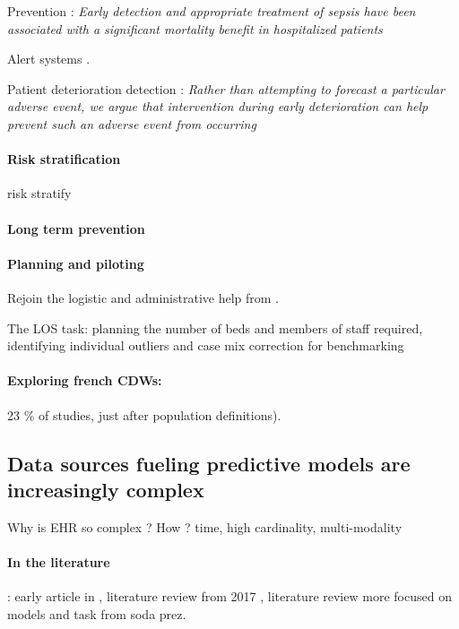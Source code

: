 \documentclass[french,12pt,twoside,a4paper]{book}
\begin{document}
Prevention : \textit{Early detection and appropriate treatment of sepsis have
  been associated with a significant mortality benefit in hospitalized patients}
\citep{wong2021external}

Alert systems \citep{yu2018artificial}.

Patient deterioration detection \citep{rothman2013development}: \textit{Rather than attempting to forecast a particular
  adverse event, we argue that intervention during early deterioration can help prevent such an adverse event from
  occurring}

\paragraph{Risk stratification}

risk stratify \citep{tang2007global}

\paragraph{Long term prevention}


\paragraph{Planning and piloting}

Rejoin the logistic and administrative help from \cite{topol2019high}.

The LOS task: planning the number of beds and members of staff required,
identifying individual outliers and case mix correction for benchmarking \citep{verburg2017models}

\paragraph{Exploring french CDWs:} 23 \% of studies, just after population definitions).

\subsection{Data sources fueling predictive models are increasingly complex}\label{subsec:predictive_models:complex_data}

Why is EHR so complex ? How ? time, high cardinality, multi-modality

\paragraph{In the literature}: early article in \cite{wu2010prediction},
literature review from 2017 \citep{goldstein2017opportunities}, literature
review more focused on models and task from soda prez.
\end{document}
